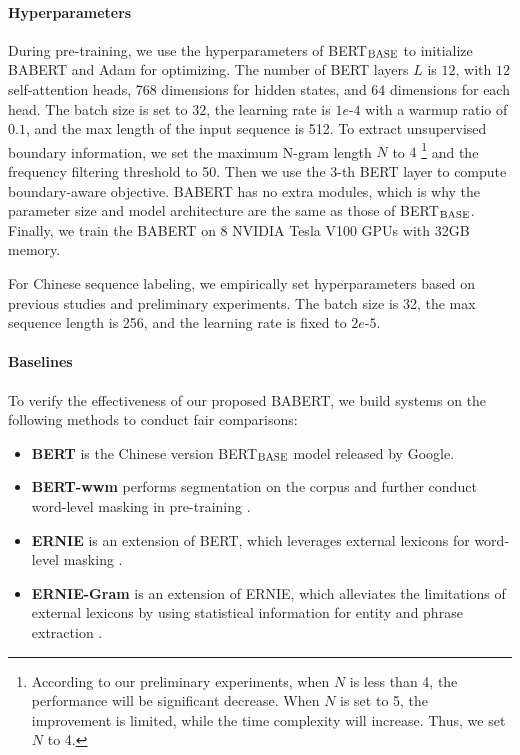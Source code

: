\documentclass[11pt]{article}
\begin{document}
\begin{CJK}{UTF8}{gbsn}
\paragraph{Hyperparameters}
During pre-training, we use the hyperparameters of BERT$_{\rm BASE}$ to initialize BABERT and Adam \cite{kingma2014adam} for optimizing.
The number of BERT layers $L$ is $12$, with $12$ self-attention heads,
768 dimensions for hidden states, and 64 dimensions for each head.
The batch size is set to $32$, the learning rate is $1e$-$4$ with a warmup ratio of $0.1$, and the max length of the input sequence is 512.
To extract unsupervised boundary information, we set the maximum N-gram length $N$ to $4$
\footnote{According to our preliminary experiments, when $N$ is less than 4, the performance will be significant decrease. When $N$ is set to 5, the improvement is limited, while the time complexity will increase. Thus, we set $N$ to 4.}
and the frequency filtering threshold to 50.
Then we use the $3$-th BERT layer to compute boundary-aware objective.
BABERT has no extra modules, which is why the parameter size and model architecture are the same as those of BERT$_{\rm BASE}$.
Finally, we train the BABERT on 8 NVIDIA Tesla V100 GPUs with 32GB memory.

For Chinese sequence labeling, we empirically set hyperparameters based on previous studies \cite{jia-etal-2020-entity,liu-etal-2021-lexicon} and preliminary experiments.
The batch size is 32, the max sequence length is 256, and the learning rate is fixed to $2e$-$5$.


\paragraph{Baselines}
To verify the effectiveness of our proposed BABERT, we build systems on the following methods to conduct fair comparisons:

\begin{itemize}
  \item \textbf{BERT} is the Chinese version BERT$_{\rm BASE}$ model released by Google.

  \item \textbf{BERT-wwm} performs segmentation on the corpus and further conduct word-level masking in pre-training \cite{cui2021pre}.

  \item \textbf{ERNIE} is an extension of BERT, which leverages external lexicons for word-level masking \cite{sun2019ernie}.

  \item \textbf{ERNIE-Gram} is an extension of ERNIE,
  which alleviates the limitations of external lexicons by using statistical information for entity and phrase extraction \cite{xiao-etal-2021-ernie}.


\end{itemize}
\end{CJK}
\end{document}
